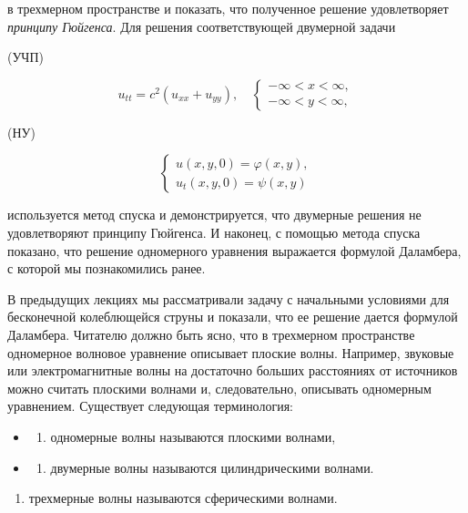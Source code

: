 \documentclass[
  ukrainian,
]{article}
\providecommand{\tightlist}{%
  \setlength{\itemsep}{0pt}\setlength{\parskip}{0pt}}
\begin{document}
в трехмерном пространстве и показать, что полученное решение
удовлетворяет \emph{принципу Гюйгенса}. Для решения соответствующей
двумерной задачи

(УЧП)

\[
u_{tt} = c^2 (u_{xx} + u_{yy}), \quad
\begin{cases} -\infty < x < \infty, \\ -\infty < y < \infty, \end{cases}
\]

(НУ)

\[
\begin{cases} u(x, y, 0) = \varphi(x, y), \\ u_t(x, y, 0) = \psi(x, y) \end{cases}
\]

используется метод спуска и демонстрируется, что двумерные решения не
удовлетворяют принципу Гюйгенса. И наконец, с помощью метода спуска
показано, что решение одномерного уравнения выражается формулой
Даламбера, с которой мы познакомились ранее.

В предыдущих лекциях мы рассматривали задачу с начальными условиями для
бесконечной колеблющейся струны и показали, что ее решение дается
формулой Даламбера. Читателю должно быть ясно, что в трехмерном
пространстве одномерное волновое уравнение описывает плоские волны.
Например, звуковые или электромагнитные волны на достаточно больших
расстояниях от источников можно считать плоскими волнами и,
следовательно, описывать одномерным уравнением. Существует следующая
терминология:

\begin{itemize}
\tightlist
\item
  \begin{enumerate}
  \def\labelenumi{\arabic{enumi})}
  \tightlist
  \item
    одномерные волны называются плоскими волнами,
  \end{enumerate}
\item
  \begin{enumerate}
  \def\labelenumi{\arabic{enumi})}
  \setcounter{enumi}{1}
  \tightlist
  \item
    двумерные волны называются цилиндрическими волнами.
  \end{enumerate}
\end{itemize}

\begin{enumerate}
\def\labelenumi{\arabic{enumi})}
\setcounter{enumi}{2}
\tightlist
\item
  трехмерные волны называются сферическими волнами.
\end{enumerate}
\end{document}
